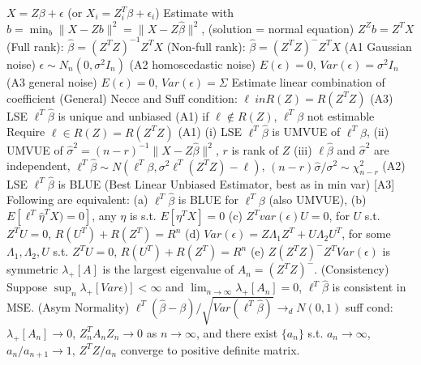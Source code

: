 \documentclass{article}
\renewcommand{\subsection}[1]{\text{\hl{[#1]}}}
\newcommand{\compact}{\nolinebreak}
\begin{document}
\subsection{Linear Model}
$X = Z\beta + \epsilon$ (or $X_i = Z_i^T \beta + \epsilon_i$)
Estimate with $b = \min_b \lVert X - Zb \rVert^2 = \lVert X - Z\hat\beta
    \rVert^2$,
(solution = normal equation) $Z^Z b = Z^T X$
(Full rank): $\hat\beta = (Z^T Z)^{-1}Z^T X$
(Non-full rank): $\hat\beta = (Z^T Z)^{-}Z^T X$
(A1 Gaussian noise) $\epsilon \sim N_n(0, \sigma^2 I_n)$
(A2 homoscedastic noise) $E(\epsilon) = 0$, $Var(\epsilon) = \sigma^2 I_n$
(A3 general noise) $E(\epsilon) = 0$, $Var(\epsilon) = \Sigma$
\compact
\subsection{Inference}
Estimate linear combination of coefficient
(General) Necce and Suff condition: $\ell \ in R(Z) = R(Z^TZ)$
(A3) LSE $\ell^T \hat\beta$ is unique and unbiased
(A1) if $\ell\notin R(Z)$, $\ell^T\beta$ not estimable
\compact
\subsection{Properties}
Require $\ell \in R(Z) = R(Z^TZ)$
(A1)
(i) LSE $\ell^T\hat\beta$ is UMVUE of $\ell^T\beta$,
(ii) UMVUE of $\hat\sigma^2 = (n-r)^{-1}\lVert X - Z\hat\beta \rVert^2$,
$r$ is rank of $Z$
(iii) $\ell\hat\beta$ and $\hat\sigma^2$ are independent,
$\ell^T\hat\beta \sim N(\ell^T\beta, \sigma^2\ell^T(Z^TZ)-\ell)$,
$(n-r)\hat\sigma/\sigma^2\sim\chi_{n-r}^2$
(A2) LSE $\ell^T\hat\beta$ is BLUE (Best Linear Unbiased Estimator, best as in min var)
[A3] Following are equivalent:
(a) $\ell^T\hat\beta$ is BLUE for $\ell^T\beta$ (also UMVUE),
(b) $E[\ell^T\hat\eta^TX)=0]$, any $\eta$ is s.t. $E[\eta^TX]=0$
(c) $Z^T var(\epsilon) U = 0$, for $U$ s.t. $Z^TU = 0$, $R(U^T)+R(Z^T)=R^n$
(d) $Var(\epsilon) = Z\Lambda_1 Z^T + U \Lambda_2 U^T$,
for some $\Lambda_1, \Lambda_2, U$ s.t. $Z^TU = 0$, $R(U^T)+R(Z^T)=R^n$
(e) $Z(Z^TZ)^-Z^T Var(\epsilon)$ is symmetric
\compact
\subsection{Asymptotic}
$\lambda_+[A]$ is the largest eigenvalue of $A_n = (Z^TZ)^-$.
(Consistency)
Suppose $\sup_n \lambda_+ [Var\epsilon)] < \infty$ and
$\lim_{n\rightarrow\infty} \lambda_+ [A_n] = 0$,
$\ell^T\hat\beta$ is consistent in MSE.
(Asym Normality)
$\ell^T(\hat\beta-\beta)/\sqrt{Var(\ell^T\hat\beta)}\rightarrow_d N(0, 1)$
suff cond: $\lambda_+[A_n]\rightarrow 0$, $Z_n^T A_n Z_n \rightarrow 0$ as
$n\rightarrow\infty$, and
there exist $\{a_n\}$ s.t. $a_n\rightarrow \infty$, $a_n/a_{n+1}\rightarrow
    1$, $Z^TZ/a_n$ converge to positive definite matrix.
\compact
\end{document}

